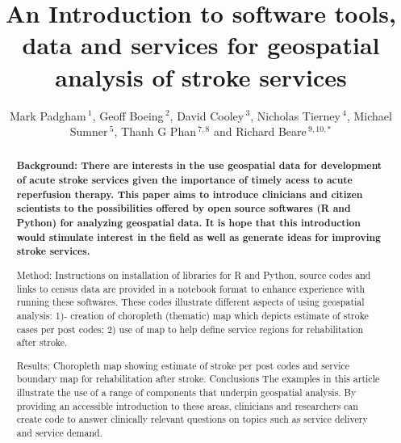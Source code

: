 \documentclass[utf8]{frontiersHLTH}
\def\firstAuthorLast{Padgham {et~al.}} %
\def\Authors{Mark Padgham\,$^{1}$, Geoff Boeing\,$^{2}$, David Cooley\,$^{3}$, Nicholas Tierney\,$^{4}$, Michael Sumner\,$^{5}$, Thanh G Phan\,$^{7,8}$ and Richard Beare\,$^{9,10,*}$}
\begin{document}
\onecolumn
{}

\title[Software tools for geospatial analysis]{{\bf An Introduction to} software tools, data and services for geospatial analysis of stroke services}

\author[\firstAuthorLast ]{\Authors} %
\address{} %
\correspondance{} %

\extraAuth{}%

\maketitle

\begin{abstract}
  {\bf
Background: There are interests in the use geospatial data for
development of acute stroke services given the importance of timely acess
to acute reperfusion therapy. This paper aims to introduce clinicians and
citizen scientists to the possibilities offered by open source softwares (R
and Python) for analyzing geospatial data. It is hope that this introduction
would stimulate interest in the field as well as generate ideas for improving
stroke services.

Method: Instructions on installation of libraries for R and Python, source
codes and links to census data are provided in a notebook format to
enhance experience with running these softwares. These codes illustrate
different aspects of using geospatial analysis: 1)- creation of choropleth
(thematic) map which depicts estimate of stroke cases per post codes; 2)
use of map to help define service regions for rehabilitation after stroke.

Results: Choropleth map showing estimate of stroke per post codes and
service boundary map for rehabilitation after stroke.
Conclusions The examples in this article illustrate the use of a range of
components that underpin geospatial analysis. By providing an accessible
introduction to these areas, clinicians and researchers can create code to
answer clinically relevant questions on topics such as service delivery
and service demand.
}
\end{abstract}
\end{document}
